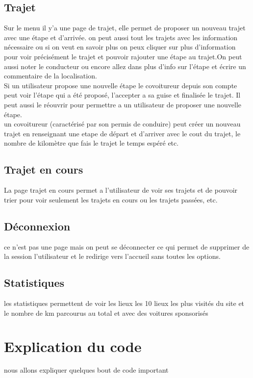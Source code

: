 	\subsection{Trajet}		
		Sur le menu il y'a une page de trajet, elle permet de proposer un nouveau trajet avec une étape et d'arrivée.
		on peut aussi tout les trajets avec les information nécessaire ou si on veut en savoir plus on peux cliquer sur plus d'information pour voir précisément le trajet et pouvoir rajouter une étape au trajet.On peut aussi noter le conducteur ou encore allez dans plus d'info sur l'étape et écrire un commentaire de la localisation. \\
		Si un utilisateur propose une nouvelle étape le covoitureur depuis son compte peut voir l'étape qui a été proposé, l'accepter a sa guise et finalisée le trajet. Il peut aussi le réouvrir pour permettre a un utilisateur de proposer une nouvelle étape.\\
		un covoitureur (caractérisé par son permis de conduire) peut créer un nouveau trajet en renseignant une etape de départ et d'arriver avec le cout du trajet, le nombre de kilomètre que fais le trajet le temps espéré etc.
		
		 
	
	\subsection{Trajet en cours}
		La page trajet en cours permet a l'utilisateur de voir ses trajets et de pouvoir trier pour voir seulement les trajets en cours ou les trajets passées, etc.
	
	\subsection{Déconnexion}
		ce n'est pas une page mais on peut se déconnecter ce qui permet de supprimer de la session l'utilisateur et le redirige vers l'accueil sans toutes les options.
	
	\subsection{Statistiques}
		les statistiques permettent de voir les lieux les 10 lieux les plus visités du site et le nombre de km parcourus au total et avec des voitures sponsorisés 
		
\section{Explication du code}
nous allons expliquer quelques bout de code important 
